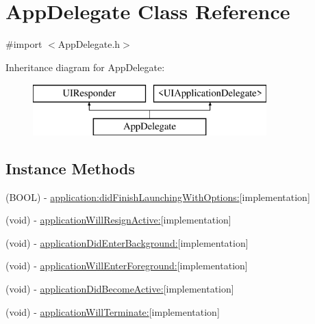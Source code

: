 \hypertarget{interface_app_delegate}{\section{App\-Delegate Class Reference}
\label{interface_app_delegate}
}


{\ttfamily \#import $<$App\-Delegate.\-h$>$}

Inheritance diagram for App\-Delegate\-:\begin{figure}[H]
\begin{center}
\leavevmode
\includegraphics[height=2.000000cm]{interface_app_delegate}
\end{center}
\end{figure}
\subsection*{Instance Methods}
\begin{DoxyCompactItemize}
\item 
(B\-O\-O\-L) -\/ \hyperlink{interface_app_delegate_a0eeb7690788c7164f03af6252048d198}{application\-:did\-Finish\-Launching\-With\-Options\-:}{\ttfamily  \mbox{[}implementation\mbox{]}}
\item 
(void) -\/ \hyperlink{interface_app_delegate_ad4e9549671ce8c4fc31bd6e4836b5a91}{application\-Will\-Resign\-Active\-:}{\ttfamily  \mbox{[}implementation\mbox{]}}
\item 
(void) -\/ \hyperlink{interface_app_delegate_a26d9be79224184ef974a09c1793eb360}{application\-Did\-Enter\-Background\-:}{\ttfamily  \mbox{[}implementation\mbox{]}}
\item 
(void) -\/ \hyperlink{interface_app_delegate_ad9916739a43349edad2877110be31059}{application\-Will\-Enter\-Foreground\-:}{\ttfamily  \mbox{[}implementation\mbox{]}}
\item 
(void) -\/ \hyperlink{interface_app_delegate_a73aa814398c205f47f21ed59b616e492}{application\-Did\-Become\-Active\-:}{\ttfamily  \mbox{[}implementation\mbox{]}}
\item 
(void) -\/ \hyperlink{interface_app_delegate_ae08d55e0d58680354fceb7c8341055eb}{application\-Will\-Terminate\-:}{\ttfamily  \mbox{[}implementation\mbox{]}}
\end{DoxyCompactItemize}
